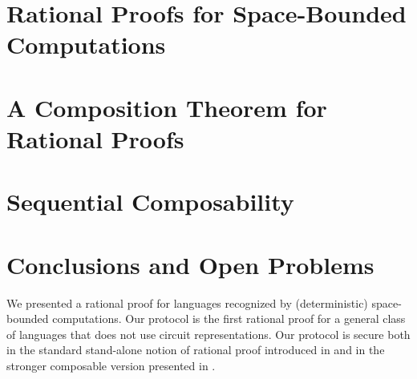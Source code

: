 \documentclass{llncs}
\begin{document}
	
	
	\section{Rational Proofs for Space-Bounded Computations }
	
	
	\section{A Composition Theorem for Rational Proofs}
	
	
	
	
	
	\section{Sequential Composability}
	\label{sec:proofs-seq-comp}
	
	
	
	
	
	
	
	
	
	
	
	\section{Conclusions and Open Problems}
	We presented a rational proof for languages recognized by (deterministic) 
	space-bounded computations. Our protocol is the first rational proof for a general class of languages that does not use circuit representations. Our protocol is secure both in the standard stand-alone notion of rational proof introduced in 
	\cite{am} and in the stronger composable version presented in \cite{cg15}. 
	
\end{document}
